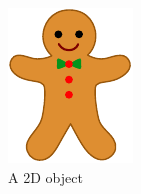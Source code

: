 \begin{figure}[tbp]
	\centering
	\begin{subfigure}[b]{0.25\linewidth}
		\centering
		\includegraphics[width=\textwidth]{figs/gingerbreadman_whole.pdf}
		\caption{A 2D object}
		\label{fig:gbm:whole}
	\end{subfigure}
	\qquad%
	\begin{subfigure}[b]{0.25\linewidth}
		\centering

\end{subfigure}
\end{figure}
